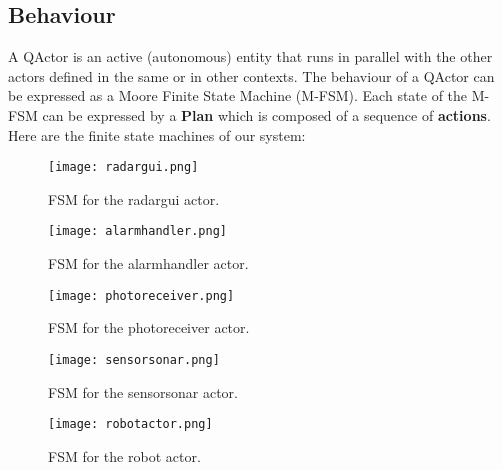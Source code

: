 \subsection{Behaviour}
A QActor is an active (autonomous) entity that runs in parallel with the other actors defined in the same or in other contexts. The behaviour of a QActor can be expressed as a Moore Finite State Machine (M-FSM). Each state of the M-FSM can be expressed by a \textbf{Plan} which is composed of a sequence of \textbf{actions}.
Here are the finite state machines of our system:
\begin{figure}[h]
	\centering
	\texttt{[image: radargui.png]}
	\caption{FSM for the radargui actor.}
\end{figure}
\begin{figure}[h]
	\centering
	\texttt{[image: alarmhandler.png]}
	\caption{FSM for the alarmhandler actor.}
\end{figure}
\begin{figure}[h]
	\centering
	\texttt{[image: photoreceiver.png]}
	\caption{FSM for the photoreceiver actor.}
\end{figure}
\begin{figure}[h]
	\centering
	\texttt{[image: sensorsonar.png]}
	\caption{FSM for the sensorsonar actor.}
\end{figure}
\begin{figure}[h]
	\centering
	\texttt{[image: robotactor.png]}
	\caption{FSM for the robot actor.}
\end{figure}
\clearpage